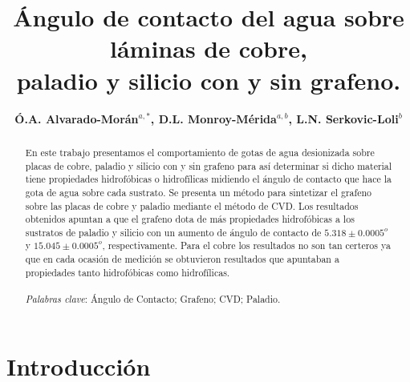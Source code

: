 \documentclass[twocolumn,letterpaper,aps,pra,10pt]{revtex4-1}
\begin{document}
\renewcommand{\figurename}{{\bf Figura }}
\renewcommand{\tablename}{{\bf Tabla}}
\renewcommand{\thesection}{\arabic{section}}
\renewcommand{\thesubsection}{\arabic{subsection}}

\lhead{}
\chead{}
\rhead{}
\cfoot{}

\vspace*{-1cm}
\title{Ángulo de contacto del agua sobre láminas de cobre, \\paladio y silicio con y sin grafeno.}
\author{\textbf{Ó.A. Alvarado-Morán$^{a,*}$, D.L. Monroy-Mérida$^{a,b}$, L.N. Serkovic-Loli$^{b}$}}

\begin{abstract}
En este trabajo presentamos el comportamiento de gotas de agua desionizada sobre placas de cobre, paladio y silicio con y sin grafeno para así determinar si dicho material tiene propiedades hidrofóbicas o hidrofílicas midiendo el ángulo de contacto que hace la gota de agua sobre cada sustrato. Se presenta un método para sintetizar el grafeno sobre las placas de cobre y paladio mediante el método de CVD. Los resultados obtenidos apuntan a que el grafeno dota de más propiedades hidrofóbicas a los sustratos de paladio y silicio con un aumento de ángulo de contacto de $5.318 \pm 0.0005^{o}$ y $15.045\pm 0.0005^{o}$, respectivamente. Para el cobre los resultados no son tan certeros ya que en cada ocasión de medición se obtuvieron resultados que apuntaban a propiedades tanto hidrofóbicas como hidrofílicas.
\\
\\
\textit{Palabras clave}: Ángulo de Contacto; Grafeno; CVD; Paladio.
\end{abstract}

\maketitle
\section{Introducción}
\end{document}
